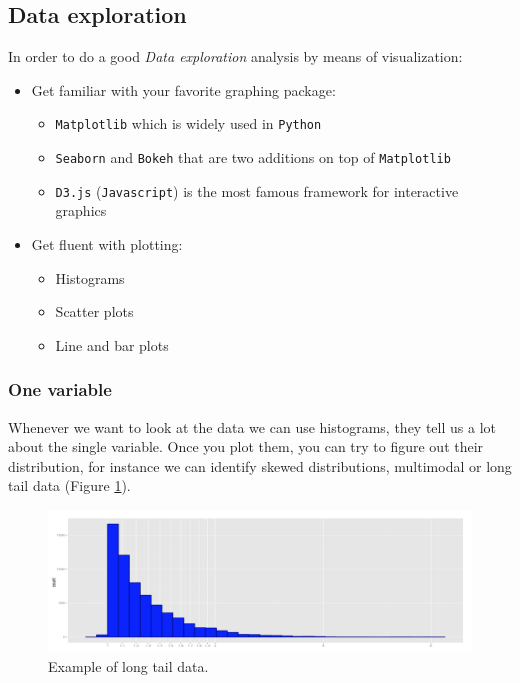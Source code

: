\subsection{Data exploration}

In order to do a good \emph{Data exploration} analysis by means of visualization:

\begin{itemize}
\item {Get familiar with your favorite graphing package:}
\begin{itemize}
\item \texttt{Matplotlib} which is widely used in \texttt{Python}
\item \texttt{Seaborn} and \texttt{Bokeh} that are two additions on top of \texttt{Matplotlib}
\item \texttt{D3.js} (\texttt{Javascript}) is the most famous framework for interactive graphics
\end{itemize}
\item {Get fluent with plotting:}
\begin{itemize}
\item Histograms
\item Scatter plots
\item Line and bar plots
\end{itemize}
\end{itemize} 

\subsubsection{One variable}

Whenever we want to look at the data we can use histograms, they tell us a lot about the single variable. Once you plot them, you can try to figure out their distribution, for instance we can identify skewed distributions, multimodal or long tail data (Figure \ref{pic:long_tail}). 

\begin{figure}[H]%
 \centering
 \includegraphics[width=13cm]{./img/06/long_tail}
 \caption{\label{pic:long_tail} Example of long tail data.}
\end{figure}

